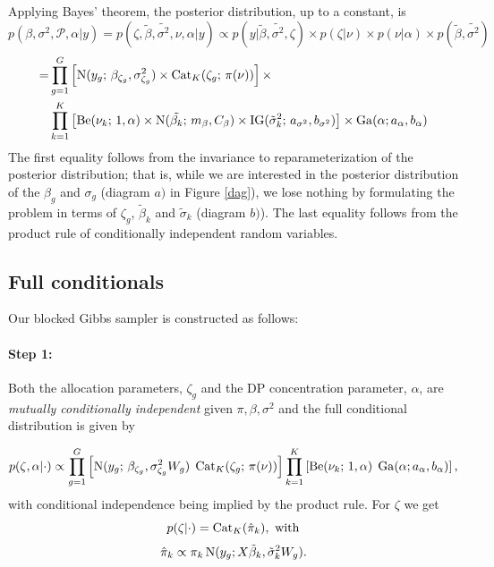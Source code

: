 {Applying Bayes' theorem, the posterior distribution, up to a constant, is
\begin{equation*}
p(\beta,\sigma^2,\mathcal{P},\alpha|y) = p(\zeta, \tilde{\beta},\tilde{\sigma^2},\nu,\alpha | y) \propto p(y|\tilde{\beta},\tilde{\sigma^2},\zeta) \times p(\zeta|\nu) \times p(\nu|\alpha) \times p(\tilde{\beta},\tilde{\sigma^2})
\end{equation*}
\begin{align*}
= & \prod_{g=1}^G \left[ \operatorname{N}(y_g;\,\beta_{\zeta_g},\sigma^2_{\zeta_g})\times \operatorname{Cat}_K(\zeta_g;\, \pi(\nu)) \right] \times \\
& \prod_{k=1}^K \left[ \operatorname{Be}(\nu_k;\, 1, \alpha) \times \operatorname{N}(\tilde{\beta_k};\,m_\beta, C_\beta) \times \operatorname{IG}(\tilde{\sigma}^2_k;\,a_{\sigma^2},b_{\sigma^2})\right] \times \operatorname{Ga}(\alpha;a_\alpha,b_\alpha)
\end{align*}
The first equality follows from the  invariance to reparameterization of the posterior distribution; that is, while we are interested in the posterior distribution of the $\beta_g$ and $\sigma_g$ (diagram $a)$ in Figure \ref{dag}), we lose nothing by formulating the problem in terms of $\zeta_g$, $\tilde{\beta}_k$ and $\tilde{\sigma}_k$ (diagram $b)$). The last equality follows from the product rule of conditionally independent random variables.

\subsection{Full conditionals}
\label{subsec:full-cond}
Our blocked Gibbs sampler is constructed as follows:
\paragraph{Step 1:}
Both the allocation parameters, $\zeta_g$ and the DP concentration parameter, $\alpha$, are \textit{mutually conditionally independent} given $\pi, \beta, \sigma^2$ and the full conditional distribution is given by

\begin{equation}
p(\zeta, \alpha|\cdot) \propto \prod_{g=1}^G \left[ \operatorname{N}(y_g;\,\beta_{\zeta_g},\sigma^2_{\zeta_g}W_g)\; \operatorname{Cat}_K(\zeta_g;\, \pi(\nu)) \right] \prod_{k=1}^K \left[ \operatorname{Be}(\nu_k;\, 1, \alpha)\; \operatorname{Ga}(\alpha;a_\alpha,b_\alpha)\right],
\end{equation}
with conditional independence being implied by the product rule. For $\zeta$ we get
\begin{equation}
\label{zetafull}
p(\zeta|\cdot) = \operatorname{Cat}_K(\hat{\pi}_k), \mbox{ with}
\end{equation}
\begin{equation*}
\hat{\pi}_k \propto \pi_k \operatorname{N}(y_g;X\tilde{\beta}_k,\tilde{\sigma}_k^2 W_g).
\end{equation*}

}
